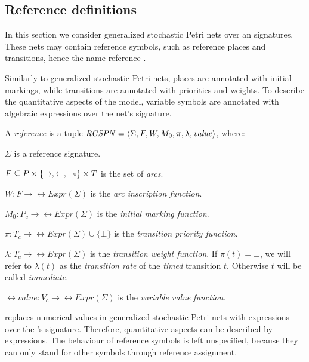 \subsection{Reference  definitions}

In this section we consider generalized stochastic Petri nets over an  signatures. These nets may contain reference symbols, such as reference places and transitions, hence the name reference .

Similarly to generalized stochastic Petri nets, places are annotated with initial markings, while transitions are annotated with priorities and weights. To describe the quantitative aspects of the model, variable symbols are annotated with algebraic expressions over the net's signature.

\begin{dfn}
  \label{dfn:rgspn:rgspn}
  A \emph{reference } is a tuple \(\textrm{\itshape RGSPN\/} = \langle \Sigma, F, W, M_0, \pi, \lambda, \textrm{\itshape value\/} \rangle\), where:
  \begin{compactitem}
  \item \(\Sigma\) is a reference  signature.
  \item \(F \subseteq P \times \{\rightarrow, \leftarrow, \multimap\} \times T\) is the set of \emph{arcs}.
  \item \(W\colon F \to \rel{Expr}(\Sigma)\) is the \emph{arc inscription function}.
  \item \(M_0\colon P_c \to \rel{Expr}(\Sigma)\) is the \emph{initial marking function}.
  \item \(\pi\colon T_c \to \rel{Expr}(\Sigma) \cup \{\bot\}\) is the \emph{transition priority function}.
  \item \(\lambda\colon T_c \to \rel{Expr}(\Sigma)\) is the \emph{transition weight function}. If \(\pi(t) = \bot\), we will refer to \(\lambda(t)\) as the \emph{transition rate} of the \emph{timed} transition \(t\). Otherwise \(t\) will be called \emph{immediate}.
  \item \(\rel{value}\colon V_c \to \rel{Expr}(\Sigma)\) is the \emph{variable value function}.
  \end{compactitem}
\end{dfn}

 replaces numerical values in generalized stochastic Petri nets with expressions over the 's signature. Therefore, quantitative aspects can be described by expressions. The behaviour of reference symbols is left unspecified, because they can only stand for other symbols through reference assignment.

